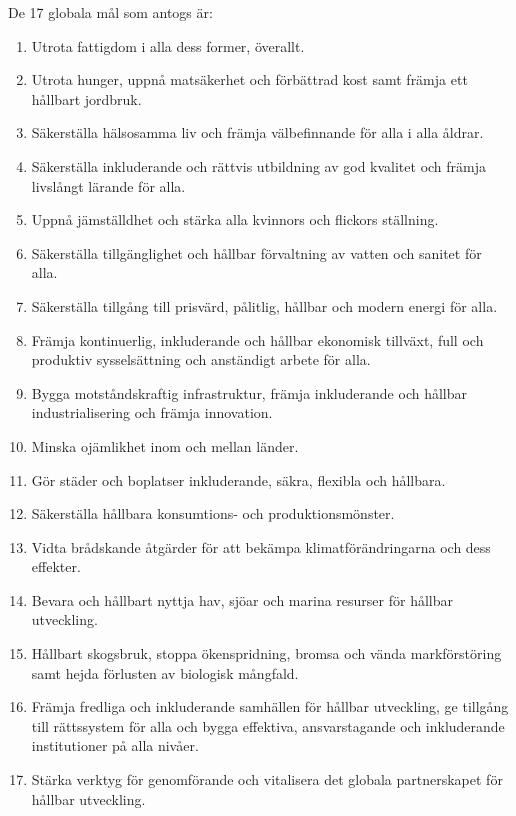 \documentclass{report}
\begin{document}
 De 17 globala mål som antogs är: 
\begin{enumerate}
\item Utrota fattigdom i alla dess former, överallt.
\item Utrota hunger, uppnå matsäkerhet och förbättrad kost samt främja ett hållbart jordbruk.
\item Säkerställa hälsosamma liv och främja välbefinnande för alla i alla åldrar.
\item Säkerställa inkluderande och rättvis utbildning av god kvalitet och främja livslångt lärande för alla.
\item Uppnå jämställdhet och stärka alla kvinnors och flickors ställning.
\item Säkerställa tillgänglighet och hållbar förvaltning av vatten och sanitet för alla.
\item Säkerställa tillgång till prisvärd, pålitlig, hållbar och modern energi för alla.
\item Främja kontinuerlig, inkluderande och hållbar ekonomisk tillväxt, full och produktiv sysselsättning och anständigt arbete för alla.
\item Bygga motståndskraftig infrastruktur, främja inkluderande och hållbar industrialisering och främja innovation.
\item Minska ojämlikhet inom och mellan länder.
\item Gör städer och boplatser inkluderande, säkra, flexibla och hållbara.
\item Säkerställa hållbara konsumtions- och produktionsmönster.
\item Vidta brådskande åtgärder för att bekämpa klimatförändringarna och dess effekter.
\item Bevara och hållbart nyttja hav, sjöar och marina resurser för hållbar utveckling.
\item Hållbart skogsbruk, stoppa ökenspridning, bromsa och vända markförstöring samt hejda förlusten av biologisk mångfald.
\item Främja fredliga och inkluderande samhällen för hållbar utveckling, ge tillgång till rättssystem för alla och bygga effektiva, ansvarstagande och inkluderande institutioner på alla nivåer.
\item Stärka verktyg för genomförande och vitalisera det globala partnerskapet för hållbar utveckling. \cite{webKTH}
\end{enumerate}
\end{document}
